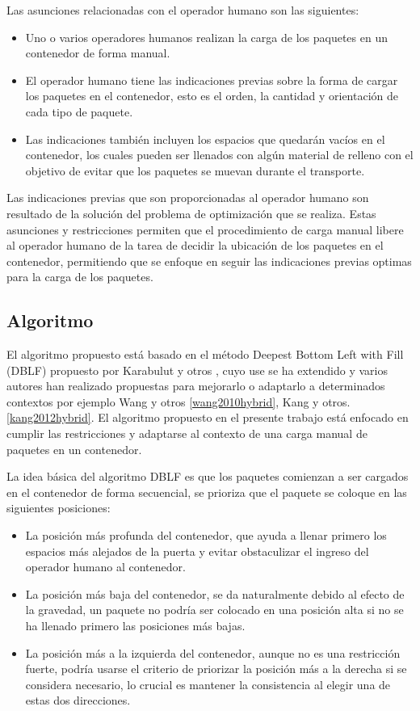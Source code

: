Las asunciones relacionadas con el operador humano son las siguientes:

\begin{itemize}
    \item Uno o varios operadores humanos realizan la carga de los paquetes en un contenedor de forma manual.
    \item El operador humano tiene las indicaciones previas sobre la forma de cargar los paquetes en el contenedor, esto es el orden, la cantidad y orientación de cada tipo de paquete.
    \item Las indicaciones también incluyen los espacios que quedarán vacíos en el contenedor, los cuales pueden ser llenados con algún material de relleno con el objetivo de evitar que los paquetes se muevan durante el transporte.
\end{itemize}

Las indicaciones previas que son proporcionadas al operador humano son resultado de la solución del problema de optimización que se realiza. Estas asunciones y restricciones permiten que el procedimiento de carga manual libere al operador humano de la tarea de decidir la ubicación de los paquetes en el contenedor, permitiendo que se enfoque en seguir las indicaciones previas optimas para la carga de los paquetes.

\subsection{Algoritmo}

El algoritmo propuesto está basado en el método Deepest Bottom Left with Fill (DBLF) propuesto por Karabulut y otros \cite{karabulut2004hybrid}, cuyo use se ha extendido y varios autores han realizado propuestas para mejorarlo o adaptarlo a determinados contextos por ejemplo Wang y otros \ref{wang2010hybrid}, Kang y otros. \ref{kang2012hybrid}. El algoritmo propuesto en el presente trabajo está enfocado en cumplir las restricciones y adaptarse al contexto de una carga manual de paquetes en un contenedor.

La idea básica del algoritmo DBLF es que los paquetes comienzan a ser cargados en el contenedor de forma secuencial, se prioriza que el paquete se coloque en las siguientes posiciones:

\begin{itemize}
    \item La posición más profunda del contenedor, que ayuda a llenar primero los espacios más alejados de la puerta y evitar obstaculizar el ingreso del operador humano al contenedor.
    \item La posición más baja del contenedor, se da naturalmente debido al efecto de la gravedad, un paquete no podría ser colocado en una posición alta si no se ha llenado primero las posiciones más bajas.
    \item La posición más a la izquierda del contenedor, aunque no es una restricción fuerte, podría usarse el criterio de priorizar la posición más a la derecha si se considera necesario, lo crucial es mantener la consistencia al elegir una de estas dos direcciones.
\end{itemize}

